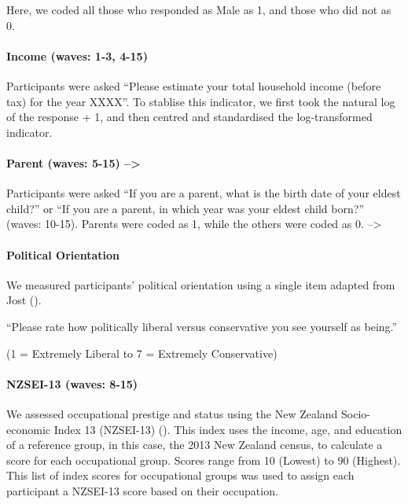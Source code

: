 \documentclass[
  singlecolumn]{article}
\let\oldparagraph\paragraph
\renewcommand{\paragraph}[1]{\oldparagraph{#1}\mbox{}}
\begin{document}
Here, we coded all those who responded as Male as 1, and those who did
not as 0.

\paragraph{Income (waves: 1-3, 4-15)}\label{income-waves-1-3-4-15}

Participants were asked ``Please estimate your total household income
(before tax) for the year XXXX''. To stablise this indicator, we first
took the natural log of the response + 1, and then centred and
standardised the log-transformed indicator.

\paragraph{Parent (waves: 5-15)
--\textgreater{}}\label{parent-waves-5-15}

Participants were asked ``If you are a parent, what is the birth date of
your eldest child?'' or ``If you are a parent, in which year was your
eldest child born?'' (waves: 10-15). Parents were coded as 1, while the
others were coded as 0. --\textgreater{}

\paragraph{Political Orientation}\label{political-orientation}

We measured participants' political orientation using a single item
adapted from Jost ().

``Please rate how politically liberal versus conservative you see
yourself as being.''

(1 = Extremely Liberal to 7 = Extremely Conservative)

\paragraph{NZSEI-13 (waves: 8-15)}\label{nzsei-13-waves-8-15}

We assessed occupational prestige and status using the New Zealand
Socio-economic Index 13 (NZSEI-13) (). This index uses the income, age, and education of
a reference group, in this case, the 2013 New Zealand census, to
calculate a score for each occupational group. Scores range from 10
(Lowest) to 90 (Highest). This list of index scores for occupational
groups was used to assign each participant a NZSEI-13 score based on
their occupation.
\end{document}
